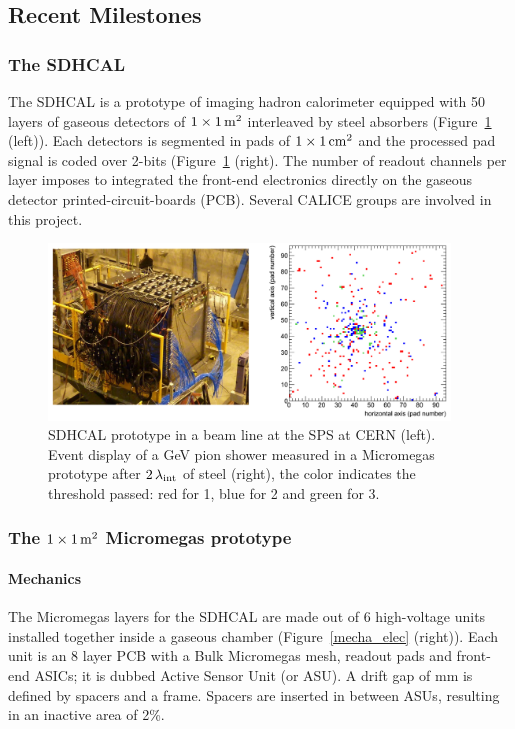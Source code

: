 \subsection{Recent Milestones}

\subsubsection{The SDHCAL}

The SDHCAL is a prototype of imaging hadron calorimeter equipped with 50 layers of gaseous detectors of $1\times \unit[1]{m^{2}}$ interleaved by steel absorbers (Figure~\ref{sdhcal} (left)). Each detectors is segmented in pads of $1\times\unit[1]{cm^{2}}$ and the processed pad signal is coded over 2-bits (Figure~\ref{sdhcal} (right). The number of readout channels per layer imposes to integrated the front-end electronics directly on the gaseous detector printed-circuit-boards (PCB). Several CALICE groups are involved in this project.

\begin{figure}
\begin{centering}
\includegraphics[width=0.95\textwidth]{Calorimeter/SDHCal/test}
\caption{SDHCAL prototype in a beam line at the SPS at CERN (left). Event display of a \unit[150]{GeV} pion shower measured in a Micromegas prototype after $\unit[2]{\lambda_{int}}$ of steel (right), the color indicates the threshold passed: red for 1, blue for 2 and green for 3.}
\label{sdhcal}
\end{centering}
\end{figure}


\subsubsection{The $1\times\unit[1]{m^{2}}$ Micromegas prototype}

\paragraph{Mechanics}
The Micromegas layers for the SDHCAL are made out of 6 high-voltage units installed together inside a gaseous chamber (Figure~\ref{mecha_elec} (right)). Each unit is an 8 layer PCB with a Bulk Micromegas mesh, readout pads and front-end ASICs; it is dubbed Active Sensor Unit (or ASU). A drift gap of \unit[3]{mm} is defined by spacers and a frame. Spacers are inserted in between ASUs, resulting in an inactive area of 2\%.


